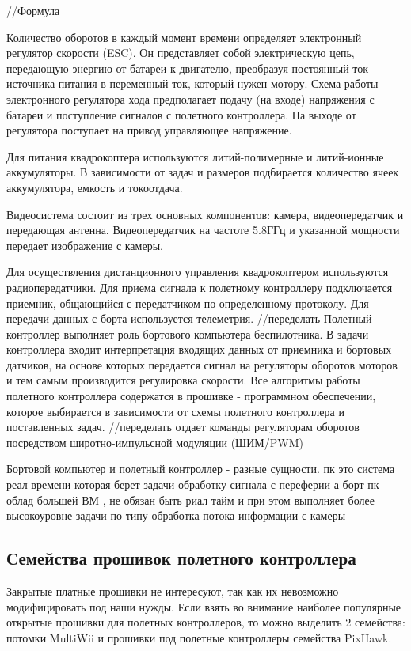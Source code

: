 //Формула 

Количество оборотов в каждый момент времени определяет электронный регулятор скорости (ESC). Он представляет собой электрическую цепь, передающую энергию от батареи к двигателю, преобразуя постоянный ток источника питания в переменный ток, который нужен мотору. Схема работы электронного регулятора хода предполагает подачу (на входе) напряжения с батареи и поступление сигналов с полетного контроллера. На выходе от регулятора поступает на привод управляющее напряжение. 

Для питания квадрокоптера используются литий-полимерные и литий-ионные аккумуляторы. В зависимости от задач и размеров подбирается количество ячеек аккумулятора, емкость и токоотдача.

Видеосистема состоит из трех основных компонентов: камера, видеопередатчик и передающая антенна.
Видеопередатчик на частоте 5.8ГГц и указанной мощности передает изображение с камеры.

Для осуществления дистанционного управления квадрокоптером используются радиопередатчики. Для приема сигнала к полетному контроллеру подключается приемник, общающийся с передатчиком по определенному протоколу. Для передачи данных с борта используется телеметрия.
//переделать
Полетный контроллер выполняет роль бортового компьютера беспилотника. В задачи контроллера входит интерпретация входящих данных от приемника и бортовых датчиков, на основе которых передается сигнал на регуляторы оборотов моторов и тем самым производится регулировка скорости. Все алгоритмы работы полетного контроллера содержатся в прошивке - программном обеспечении, которое выбирается в зависимости от схемы полетного контроллера и поставленных задач.
//переделать
отдает команды регуляторам оборотов посредством широтно-импульсной модуляции (ШИМ/PWM)

Бортовой компьютер и полетный контроллер - разные сущности.
пк это система реал времени которая берет задачи обработку сигнала с переферии
а борт пк облад большей ВМ , не обязан быть риал тайм и при этом выполняет более высокоуровне задачи по типу обработка потока информации с камеры

\subsection{Семейства прошивок полетного контроллера}
Закрытые платные прошивки не интересуют, так как их невозможно модифицировать под наши нужды. Если взять во внимание наиболее популярные открытые прошивки для полетных контроллеров, то можно выделить 2 семейства: потомки MultiWii и прошивки под полетные контроллеры семейства PixHawk.

